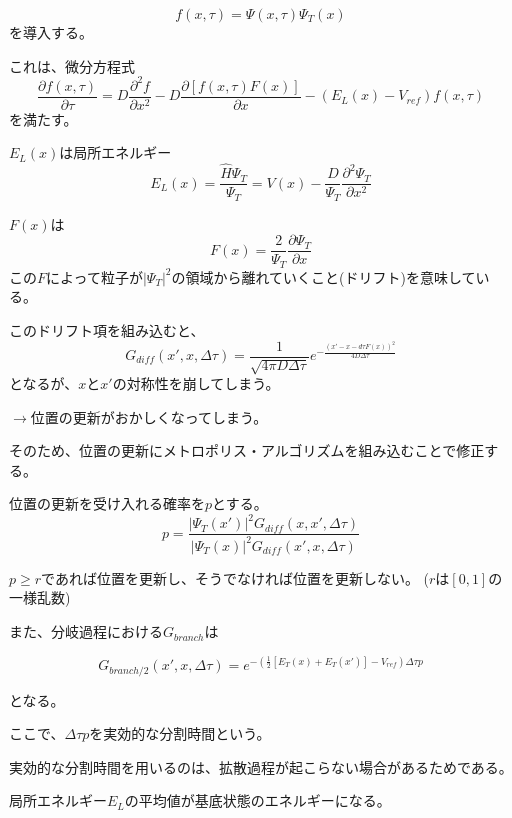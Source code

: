 \documentclass[dvipdfmx]{beamer}
\begin{document}
    \begin{frame}
      \begin{equation}
        f(x,\tau) = \Psi(x,\tau)\Psi_T(x)
      \end{equation}
      を導入する。

      これは、微分方程式
      \begin{equation}
        \frac{\partial f(x,\tau)}{\partial \tau} = D\frac{\partial^2 f}{\partial x^2} - D\frac{\partial [f(x,\tau)F(x)]}{\partial x} - (E_L(x) - V_{ref})f(x,\tau)
      \end{equation}
      を満たす。

      $E_L(x)$は局所エネルギー
      \begin{equation}
        E_L(x) = \frac{\hat{H}\Psi_T}{\Psi_T} = V(x) - \frac{D}{\Psi_T}\frac{\partial^2 \Psi_T}{\partial x^2}
      \end{equation}

      $F(x)$は
      \begin{equation}
        F(x) = \frac{2}{\Psi_T}\frac{\partial \Psi_T}{\partial x}
      \end{equation}
      この$F$によって粒子が$|\Psi_T|^2$の領域から離れていくこと(ドリフト)を意味している。
    \end{frame}

    \begin{frame}
      このドリフト項を組み込むと、
      \begin{equation}
        G_{diff}(x',x,\Delta\tau) = \dfrac{1}{\sqrt{4\pi D\Delta\tau}}
        e^{-\frac{(x'-x - d\tau F(x))^2}{4D\Delta\tau}}
      \end{equation}
      となるが、$x$と$x'$の対称性を崩してしまう。

      $\to$位置の更新がおかしくなってしまう。

      そのため、位置の更新にメトロポリス・アルゴリズムを組み込むことで修正する。

    \end{frame}

    \begin{frame}
      位置の更新を受け入れる確率を$p$とする。
      \begin{equation}
        p = \frac{|\Psi_T(x')|^2 G_{diff}(x,x',\Delta\tau)}{|\Psi_T(x)|^2G_{diff}(x',x,\Delta\tau)}
      \end{equation}

      $p \geq r$であれば位置を更新し、そうでなければ位置を更新しない。
      ($r$は$[0,1]$の一様乱数)

      また、分岐過程における$G_{branch}$は

      \begin{equation}
        G_{branch/2}(x',x,\Delta\tau) = e^{-(\frac{1}{2}[E_T(x)+E_T(x')]-V_{ref})\Delta\tau p}
      \end{equation}

      となる。

      ここで、$\Delta\tau p$を実効的な分割時間という。

      実効的な分割時間を用いるのは、拡散過程が起こらない場合があるためである。

      局所エネルギー$E_L$の平均値が基底状態のエネルギーになる。
    \end{frame}
\end{document}
